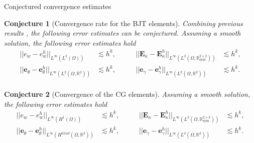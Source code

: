 \documentclass[aspectratio=169]{ISAE-Beamer}
\DeclareMathOperator*{\Grad}{Grad}
\newcommand{\bbR}{\mathbb{R}}
\newtheorem{conjecture}{Conjecture}
\begin{document}
\begin{frame}{Conjectured convergence estimates}

\begin{conjecture}[Convergence rate for the BJT elements]
	\setlength{\abovedisplayskip}{0pt}
	\setlength{\belowdisplayskip}{0pt}
	Combining previous results , the following error estimates can be conjectured. Assuming a smooth solution, the following error estimates hold 
	\begin{equation*}
	\label{eq:errBEC}
	\begin{aligned}
	||e_w - e_w^h||_{L^{\infty}(L^2(\Omega))} &\lesssim h^{k}, \\
	||\bm{e}_\theta - \bm{e}_\theta^h||_{L^{\infty}(L^2(\Omega, \bbR^2))} &\lesssim h^{k}, \\
	\end{aligned} \qquad
	\begin{aligned}
	||\bm{E}_\kappa - \bm{E}_\kappa^h||_{L^{\infty}(L^2(\Omega, \bbR^{2\times 2}_{\text{sym}}))} &\lesssim  h^{k}, \\
	||\bm{e}_\gamma - \bm{e}_\gamma^ h||_{L^{\infty}(L^2(\Omega, \bbR^2))} &\lesssim  h^{k}. \\
	\end{aligned} 
	\end{equation*}
\end{conjecture}

\begin{conjecture}[Convergence of the CG elements]
\setlength{\abovedisplayskip}{0pt}
\setlength{\belowdisplayskip}{0pt}
	Assuming a smooth solution, the following error estimates hold 
	\begin{equation*}
	\label{eq:errCGDG}
	\begin{aligned}
	||e_w - e_w^h||_{L^{\infty}(H^1(\Omega))} &\lesssim h^{k}, \\
	||\bm{e}_\theta - \bm{e}_\theta^h||_{L^{\infty}(H^{\Grad}(\Omega, \bbR^2))} &\lesssim h^{k}, \\
	\end{aligned} \qquad
	\begin{aligned}
	||\bm{E}_\kappa - \bm{E}_\kappa^h||_{L^{\infty}(L^2(\Omega, \bbR^{2\times 2}_{\text{sym}}))} &\lesssim  h^{k}, \\
	||\bm{e}_\gamma - \bm{e}_\gamma^ h||_{L^{\infty}(L^2(\Omega, \bbR^2))} &\lesssim  h^{k}. \\
	\end{aligned} 
	\end{equation*}
	
\end{conjecture}
\end{frame}
\end{document}
